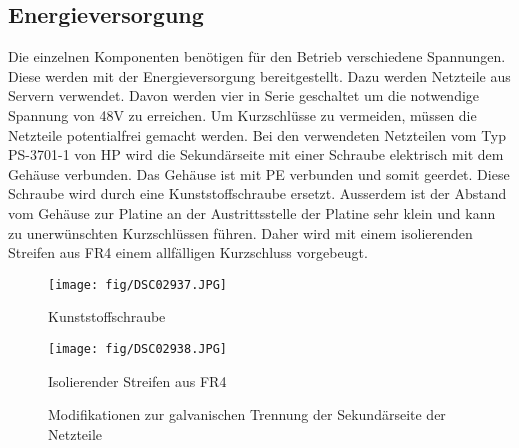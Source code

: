 \subsection{Energieversorgung}
Die einzelnen Komponenten benötigen für den Betrieb verschiedene Spannungen. 
Diese werden mit der Energieversorgung bereitgestellt. Dazu werden Netzteile 
aus Servern verwendet. Davon werden vier in Serie geschaltet um die notwendige 
Spannung von 48\si{\volt} zu erreichen. Um Kurzschlüsse zu vermeiden, müssen 
die Netzteile potentialfrei gemacht werden. Bei den verwendeten Netzteilen vom 
Typ PS-3701-1 von HP wird die Sekundärseite mit einer Schraube elektrisch mit 
dem Gehäuse verbunden. Das Gehäuse ist mit PE verbunden und somit geerdet. 
Diese Schraube wird durch eine Kunststoffschraube ersetzt. Ausserdem ist der 
Abstand vom Gehäuse zur Platine an der Austrittsstelle der Platine sehr klein 
und kann zu unerwünschten Kurzschlüssen führen. Daher wird mit einem 
isolierenden Streifen aus FR4 einem allfälligen Kurzschluss vorgebeugt. 
\begin{figure}[h!]
    \begin{minipage}{0.5\textwidth}
        \centering
        \texttt{[image: fig/DSC02937.JPG]}
        \caption*{Kunststoffschraube}
        \label{fig:e_sup_mod_screw}
    \end{minipage}
    \begin{minipage}{0.5\textwidth}
        \centering
        \texttt{[image: fig/DSC02938.JPG]}
        \caption*{Isolierender Streifen aus FR4}
        \label{fig:e_sup_mod_strip}
    \end{minipage}
    \caption{Modifikationen zur galvanischen Trennung der Sekundärseite der Netzteile}
    \label{fig:e_sup_mod}
\end{figure}

